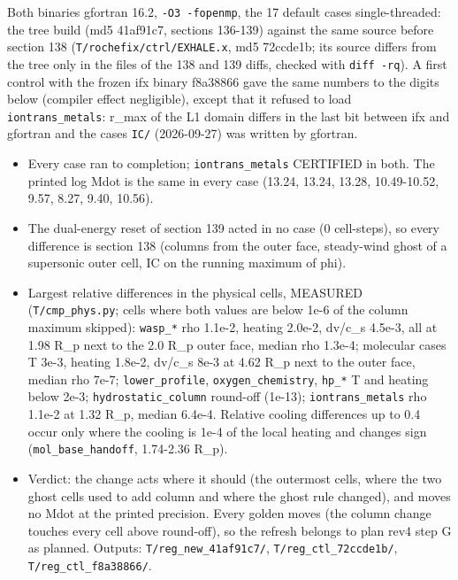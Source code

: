 \documentclass[english,a4paper]{my_memo}
\providecommand{\tightlist}{\setlength{\itemsep}{0pt}\setlength{\parskip}{0pt}}
\begin{document}
Both binaries gfortran 16.2, \texttt{-O3\ -fopenmp}, the 17 default cases single-threaded: the tree build (md5 41af91c7, sections 136-139) against the same source before section 138 (\texttt{T/rochefix/ctrl/EXHALE.x}, md5 72ccde1b; its source differs from the tree only in the files of the 138 and 139 diffs, checked with \texttt{diff\ -rq}). A first control with the frozen ifx binary f8a38866 gave the same numbers to the digits below (compiler effect negligible), except that it refused to load \texttt{iontrans\_metals}: r\_max of the L1 domain differs in the last bit between ifx and gfortran and the case\textquotesingle s \texttt{IC/} (2026-09-27) was written by gfortran.

\begin{itemize}
\tightlist
\item
  Every case ran to completion; \texttt{iontrans\_metals} CERTIFIED in both. The printed log Mdot is the same in every case (13.24, 13.24, 13.28, 10.49-10.52, 9.57, 8.27, 9.40, 10.56).
\item
  The dual-energy reset of section 139 acted in no case (0 cell-steps), so every difference is section 138 (columns from the outer face, steady-wind ghost of a supersonic outer cell, IC on the running maximum of phi).
\item
  Largest relative differences in the physical cells, MEASURED (\texttt{T/cmp\_phys.py}; cells where both values are below 1e-6 of the column maximum skipped): \texttt{wasp\_*} rho 1.1e-2, heating 2.0e-2, \textbar dv\textbar/c\_s 4.5e-3, all at 1.98 R\_p next to the 2.0 R\_p outer face, median rho 1.3e-4; molecular cases T 3e-3, heating 1.8e-2, \textbar dv\textbar/c\_s 8e-3 at 4.62 R\_p next to the outer face, median rho 7e-7; \texttt{lower\_profile}, \texttt{oxygen\_chemistry}, \texttt{hp\_*} T and heating below 2e-3; \texttt{hydrostatic\_column} round-off (1e-13); \texttt{iontrans\_metals} rho 1.1e-2 at 1.32 R\_p, median 6.4e-4. Relative cooling differences up to 0.4 occur only where the cooling is 1e-4 of the local heating and changes sign (\texttt{mol\_base\_handoff}, 1.74-2.36 R\_p).
\item
  Verdict: the change acts where it should (the outermost cells, where the two ghost cells used to add column and where the ghost rule changed), and moves no Mdot at the printed precision. Every golden moves (the column change touches every cell above round-off), so the refresh belongs to plan rev4 step G as planned. Outputs: \texttt{T/reg\_new\_41af91c7/}, \texttt{T/reg\_ctl\_72ccde1b/}, \texttt{T/reg\_ctl\_f8a38866/}.
\end{itemize}
\end{document}
